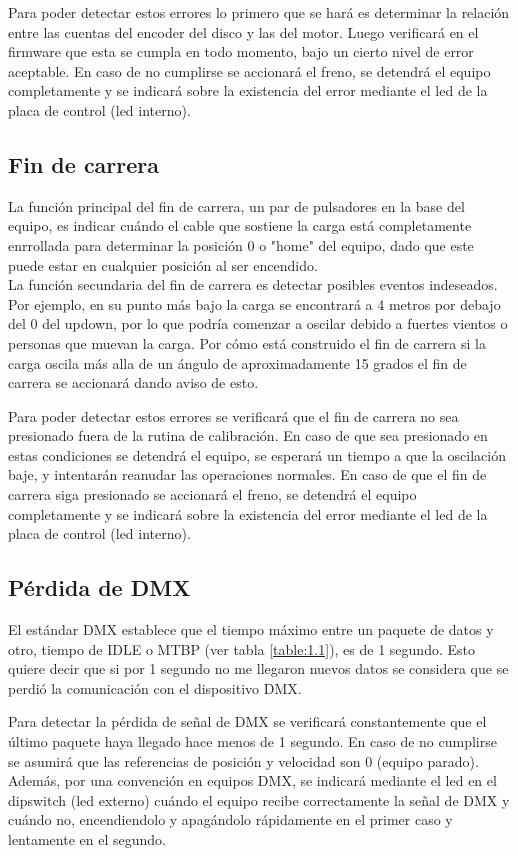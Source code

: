 Para poder detectar estos errores lo primero que se hará es determinar la relación entre las cuentas del encoder del disco y las del motor. Luego verificará en el firmware que esta se cumpla en todo momento, bajo un cierto nivel de error aceptable. En caso de no cumplirse se accionará el freno, se detendrá el equipo completamente y se indicará sobre la existencia del error mediante el led de la placa de control (led interno).

\subsection{Fin de carrera}
La función principal del fin de carrera, un par de pulsadores en la base del equipo, es indicar cuándo el cable que sostiene la carga está completamente enrrollada para determinar la posición 0 o "home" del equipo, dado que este puede estar en cualquier posición al ser encendido.\\
La función secundaria del fin de carrera es detectar posibles eventos indeseados. Por ejemplo, en su punto más bajo la carga se encontrará a 4 metros por debajo del 0 del updown, por lo que podría comenzar a oscilar debido a fuertes vientos o personas que muevan la carga. Por cómo está construido el fin de carrera si la carga oscila más alla de un ángulo de aproximadamente 15 grados el fin de carrera se accionará dando aviso de esto.

Para poder detectar estos errores se verificará que el fin de carrera no sea presionado fuera de la rutina de calibración. En caso de que sea presionado en estas condiciones se detendrá el equipo, se esperará un tiempo a que la oscilación baje, y intentarán reanudar las operaciones normales. En caso de que el fin de carrera siga presionado se accionará el freno, se detendrá el equipo completamente y se indicará sobre la existencia del error mediante el led de la placa de control (led interno).


\subsection{Pérdida de DMX}
El estándar DMX establece que el tiempo máximo entre un paquete de datos y otro, tiempo de IDLE o MTBP (ver tabla \ref{table:1.1}), es de 1 segundo. Esto quiere decir que si por 1 segundo no me llegaron nuevos datos se considera que se perdió la comunicación con el dispositivo DMX.

Para detectar la pérdida de señal de DMX se verificará constantemente que el último paquete haya llegado hace menos de 1 segundo. En caso de no cumplirse se asumirá que las referencias de posición y velocidad son 0 (equipo parado). Además, por una convención en equipos DMX, se indicará mediante el led en el dipswitch (led externo) cuándo el equipo recibe correctamente la señal de DMX y cuándo no, encendiendolo y apagándolo rápidamente en el primer caso y lentamente en el segundo.


